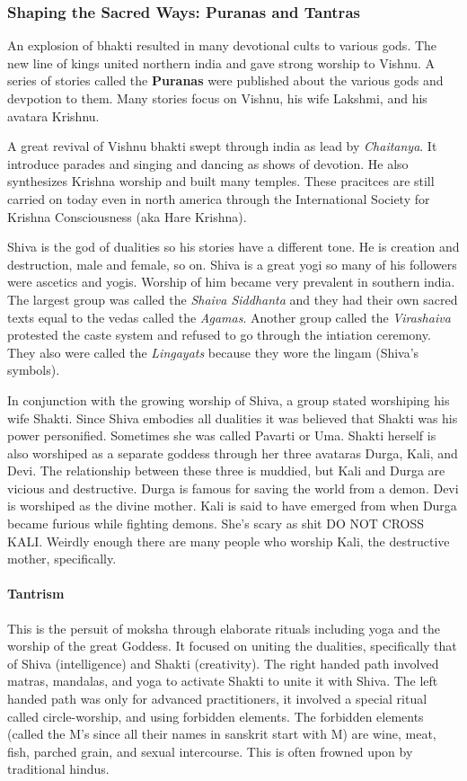 \documentclass{article}
\begin{document}
\subsubsection*{Shaping the Sacred Ways: Puranas and Tantras}
\label{ssub:shaping_the_sacred_ways_puranas_and_tantras}
An explosion of bhakti resulted in many devotional cults to various gods. The new line of kings united northern india and gave strong worship to Vishnu. A series of stories called the \textbf{Puranas} were published about the various gods and devpotion to them. Many stories focus on Vishnu, his wife Lakshmi, and his avatara Krishnu.

A great revival of Vishnu bhakti swept through india as lead by \emph{Chaitanya}. It introduce parades and singing and dancing as shows of devotion. He also synthesizes Krishna worship and built many temples. These pracitces are still carried on today even in north america through the International Society for Krishna Consciousness (aka Hare Krishna).

Shiva is the god of dualities so his stories have a different tone. He is creation and destruction, male and female, so on. Shiva is a great yogi so many of his followers were ascetics and yogis. Worship of him became very prevalent in southern india. The largest group was called the \emph{Shaiva Siddhanta} and they had their own sacred texts equal to the vedas called the \emph{Agamas}. Another group called the \emph{Virashaiva} protested the caste system and refused to go through the intiation ceremony. They also were called the \emph{Lingayats} because they wore the lingam (Shiva's symbols).

In conjunction with the growing worship of Shiva, a group stated worshiping his wife Shakti. Since Shiva embodies all dualities it was believed that Shakti was his power personified. Sometimes she was called Pavarti or Uma. Shakti herself is also worshiped as a separate goddess through her three avataras Durga, Kali, and Devi. The relationship between these three is muddied, but Kali and Durga are vicious and destructive. Durga is famous for saving the world from a demon. Devi is worshiped as the divine mother. Kali is said to have emerged from when Durga became furious while fighting demons. She's scary as shit DO NOT CROSS KALI. Weirdly enough there are many people who worship Kali, the destructive mother, specifically.

\paragraph{Tantrism}
\label{par:tantrism}
This is the persuit of moksha through elaborate rituals including yoga and the worship of the great Goddess. It focused on uniting the dualities, specifically that of Shiva (intelligence) and Shakti (creativity). The right handed path involved matras, mandalas, and yoga to activate Shakti to unite it with Shiva. The left handed path was only for advanced practitioners, it involved a special ritual called circle-worship, and using forbidden elements. The forbidden elements (called the  M's since all their names in sanskrit start with M) are wine, meat, fish, parched grain, and sexual intercourse. This is often frowned upon by traditional hindus.
\end{document}
